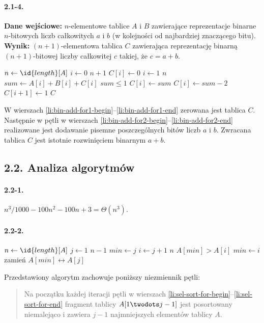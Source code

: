 \paragraph{2.1-4.}
\textbf{Dane wejściowe:} $n$-elementowe tablice $A$ i $B$ zawierające reprezentacje binarne $n$-bitowych liczb całkowitych $a$ i $b$ (w kolejności od najbardziej znaczącego bitu). \\ 
\textbf{Wynik:} $(n+1)$-elementowa tablica $C$ zawierająca reprezentację binarną $(n+1)$-bitowej liczby całkowitej $c$ takiej, że $c=a+b$.
\begin{codebox}
\li $n\gets\id{length}[A]$
\li \For $i\gets 0$ \To $n+1$ \label{li:bin-add-for1-begin}
\li     \Do
            $C[i]\gets 0$
        \End \label{li:bin-add-for1-end}
\li \For $i\gets 1$ \To $n$ \label{li:bin-add-for2-begin}
\li     \Do
            $sum\gets A[i]+B[i]+C[i]$
\li         \If $sum\le 1$
\li             \Then
                    $C[i]\gets sum$
\li             \Else
                    $C[i]\gets sum-2$
\li                 $C[i+1]\gets 1$
                \End
        \End \label{li:bin-add-for2-end}
\li \Return $C$
\end{codebox}
W wierszach \ref{li:bin-add-for1-begin}--\ref{li:bin-add-for1-end} zerowana jest tablica $C$. Następnie w pętli  w wierszach \ref{li:bin-add-for2-begin}--\ref{li:bin-add-for2-end} realizowane jest dodawanie pisemne poszczególnych bitów liczb $a$ i $b$. Zwracana tablica $C$ jest istotnie rozwinięciem binarnym $a+b$.

\subsection*{2.2. Analiza algorytmów}

\paragraph{2.2-1.}
$n^3/1000-100n^2-100n+3 = \Theta(n^3)$.

\paragraph{2.2-2.}
\begin{codebox}
\li $n\gets \id{length}[A]$
\li \For $j\gets 1$ \To $n-1$ \label{li:sel-sort-for-begin}
\li     \Do
            $min\gets j$
\li         \For $i\gets j+1$ \To $n$
\li             \Do
                    \If $A[min]>A[i]$
\li                     \Then
                           $min\gets i$
                        \End
                \End
\li         zamień $A[min]\leftrightarrow A[j]$
        \End \label{li:sel-sort-for-end}
\end{codebox}
Przedstawiony algorytm zachowuje poniższy niezmiennik pętli:
\begin{quote}
Na początku każdej iteracji pętli  w wierszach \ref{li:sel-sort-for-begin}--\ref{li:sel-sort-for-end} fragment tablicy $A[1\twodots j-1]$ jest posortowany niemalejąco i zawiera $j-1$ najmniejszych elementów tablicy $A$.
\end{quote}

